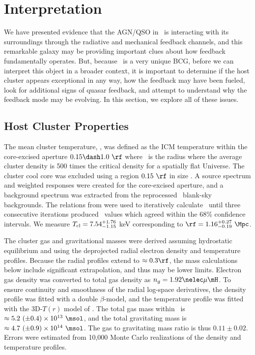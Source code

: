 \documentclass[useAMS,usenatbib]{mn2e}
\begin{document}
\section{Interpretation}
\label{sec:interp}

We have presented evidence that the AGN/QSO in \irs\ is interacting
with its surroundings through the radiative and mechanical feedback
channels, and this remarkable galaxy may be providing important clues
about how feedback fundamentally operates. But, because \irs\ is a
very unique BCG, before we can interpret this object in a broader
context, it is important to determine if the host cluster appears
exceptional in any way, how the feedback may have been fueled, look
for additional signs of quasar feedback, and attempt to understand why
the feedback mode may be evolving. In this section, we explore all of
these issues.

\subsection{Host Cluster Properties}

The mean cluster temperature, \cltx, was defined as the ICM
temperature within the core-excised aperture $0.15 \dash 1.0~\rf$
where \rf\ is the radius where the average cluster density is 500
times the critical density for a spatially flat Universe. The cluster
cool core was excluded using a region $0.15 ~\rf$ in size
\citep{2007ApJ...668..772M}. A source spectrum and weighted responses
were created for the core-excised aperture, and a background spectrum
was extracted from the reprocessed \caldb\ blank-sky backgrounds. The
relations from \cite{2002A&A...389....1A} were used to iteratively
calculate \rf\ until three consecutive iterations produced
\cltx\ values which agreed within the 68\% confidence intervals. We
measure $T_{\rm{cl}} = 7.54^{+1.76}_{-1.15}$ keV corresponding to $\rf =
1.16^{+0.27}_{-0.19}~\Mpc$.

The cluster gas and gravitational masses were derived assuming
hydrostatic equilibrium and using the deprojected radial electron
density and temperature profiles. Because the radial profiles extend
to $\approx 0.3 \rf$, the mass calculations below include significant
extrapolation, and thus may be lower limits. Electron gas density was
converted to total gas density as $n_g = 1.92 \nelec \mu \mH$. To
ensure continuity and smoothness of the radial log-space derivatives,
the density profile was fitted with a double $\beta$-model, and the
temperature profile was fitted with the 3D-$T(r)$ model of
\citet{2006ApJ...640..691V}. The total gas mass within \rf\ is
$\approx 5.2 ~(\pm 0.4) \times 10^{13} ~\msol$, and the total
gravitating mass is $\approx 4.7 ~(\pm 0.9) \times 10^{14}
~\msol$. The gas to gravitating mass ratio is thus $0.11 \pm
0.02$. Errors were estimated from 10,000 Monte Carlo realizations of
the density and temperature profiles.
\end{document}
